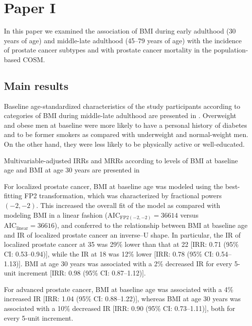 %

\section{Paper I}

In this paper we examined the association of BMI during early adulthood (30 years of age) and middle-late adulthood (45--79 years of age) with  the incidence of prostate cancer subtypes and with prostate cancer mortality in the population-based COSM.

\subsection{Main results}

Baseline age-standardized characteristics of the study participants according to categories of BMI during middle-late adulthood are presented in . Overweight and obese men at baseline were more likely to have a personal history of diabetes and to be former smokers as compared with underweight and normal-weight men. On the other hand, they were less likely to be physically active or well-educated.

Multivariable-adjusted IRRs and MRRs according to levels of BMI at baseline age and BMI at age 30 years are presented in 

For localized prostate cancer, BMI at baseline age was modeled using the best-fitting FP2 transformation, which was characterized by fractional powers $(-2, -2)$. This increased the overall fit of the model as compared with modeling BMI in a linear fashion ($\mathrm{AIC}_{\textrm{FP2}(-2,-2)} = 36614$ versus $\mathrm{AIC}_{\textrm{linear}} = 36616$), and conferred to the relationship between BMI at baseline age and IR of localized prostate cancer an inverse--U shape. In particular, the IR of localized prostate cancer at 35 \kgmsq{} was 29\% lower than that at 22 \kgmsq{} [IRR: 0.71 (95\% CI: 0.53--0.94)], while the IR at 18 \kgmsq{} was 12\% lower [IRR: 0.78 (95\% CI: 0.54--1.13)]. BMI at age 30 years was associated with a 2\% decreased IR for every 5-unit increment [IRR: 0.98 (95\% CI: 0.87--1.12)].

For advanced prostate cancer, BMI at baseline age was associated with a 4\% increased IR [IRR: 1.04 (95\% CI: 0.88--1.22)], whereas BMI at age 30 years was associated with a 10\% decreased IR [IRR: 0.90 (95\% CI: 0.73--1.11)], both for every 5-unit increment.

